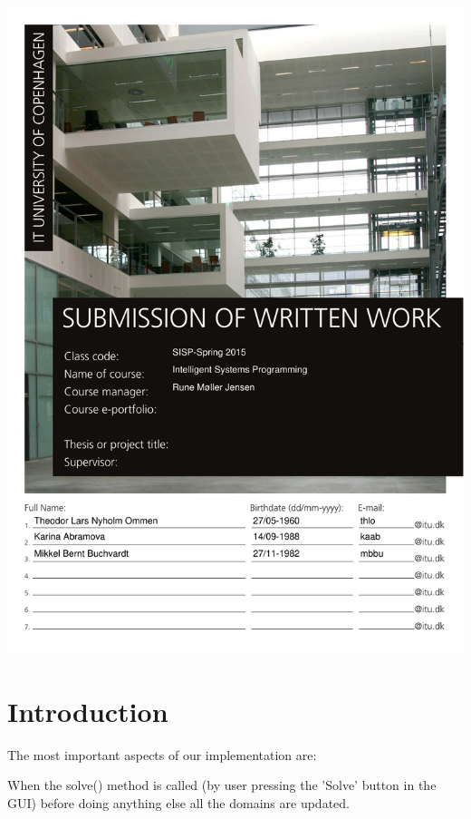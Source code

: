 




\includegraphics[scale=0.7]{./frontpage}

\begingroup
\let\flushleft
\let\endcenter\endflushleft
\maketitle
\endgroup



\section{Introduction}

The most important aspects of our implementation are:

When the solve() method is called (by user pressing the 'Solve' button in the GUI) before doing anything else all the domains are updated.

